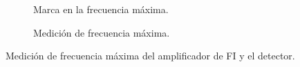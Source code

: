     \begin{figure}[H]
      \centering
      \begin{subfigure}[ht]{0.48\textwidth}
        \caption{Marca en la frecuencia máxima.}
        \label{fig:FrecuenciaMaxFI_Osc}
      \end{subfigure}
      \hfill 
      \begin{subfigure}[ht]{0.48\textwidth}
        \caption{Medición de frecuencia máxima.}
        \label{fig:FrecuneciaMaxFI_Gener}
      \end{subfigure}

      \caption{Medición de frecuencia máxima del amplificador de FI y el detector.}
      \label{fig:FrecuenciaMaxFI}
    \end{figure}

